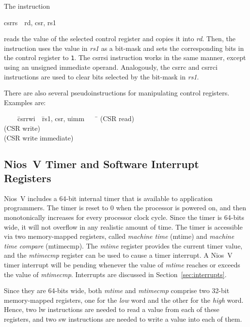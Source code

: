 \documentclass[11pt, twoside, pdftex]{article}
\newenvironment{ctabbing}%
{\begin{center}\begin{minipage}{\textwidth}\begin{tabbing}}
{\end{tabbing}\end{minipage}\end{center}}
\begin{document}
The instruction
\vspace{-\baselineskip}
\begin{center}
{\sf csrrs~~rd, csr, rs1} 
\end{center}
reads the value of the selected control register and copies it into {\it rd}. Then, the 
instruction uses the value in {\it rs1} as a bit-mask and sets the corresponding bits in the 
control register to \texttt{1}.  The {\sf csrrsi} instruction works in the same manner, 
except using an unsigned immediate operand.
Analogously, the {\sf csrrc} and {\sf csrrci} 
instructions are used to clear bits selected by the bit-mask in {\it rs1}. 

There are also several pseudoinstructions for manipulating control registers. Examples are:
\begin{ctabbing}
~~~~\={\sf csrrwi}~~\={\sf rs1, csr, uimm}~~~~\=\kill
{}  \>(CSR read)\\
  \>(CSR write)\\
  \>(CSR write immediate)\\
\end{ctabbing}
\vspace{-\baselineskip}

\subsection{Nios~V Timer and Software Interrupt Registers}
\label{sec:timer}
Nios~V includes a 64-bit internal timer that is available to application programmers. 
The timer is reset to 0 when the processor is powered on, and then monotonically
increases for every processor clock cycle. 
Since the timer is 64-bits wide, it will not overflow in any realistic amount
of time. The timer is accessible via two memory-mapped registers, called {\it machine
time} (mtime) and {\it machine time compare} (mtimecmp). The {\it mtime} register provides 
the current timer value, and the {\it mtimecmp} register can be used to cause a timer 
interrupt. A Nios~V timer interrupt will be pending whenever the value of {\it mtime} reaches or
exceeds the value of {\it mtimecmp}. Interrupts are discussed in Section~\ref{sec:interrupts}.

Since they are 64-bits wide, both {\it mtime} and {\it mtimecmp} comprise two 32-bit 
memory-mapped registers, one for the {\it low} word and the other for the {\it high} word. 
Hence, two {\sf lw} instructions are needed to read a value from each of these registers, and 
two {\sf sw} instructions are needed to write a value into each of them.
\end{document}
